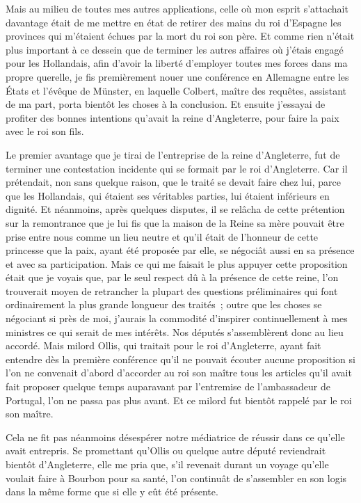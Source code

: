 \documentclass[french,twoside]{book} %
\begin{document}
Mais au milieu de toutes mes autres applications, celle où mon esprit s’attachait davantage était de me mettre en état de retirer des mains du roi d’Espagne les provinces qui m’étaient échues par la mort du roi son père. Et comme rien n’était plus important à ce dessein que de terminer les autres affaires où j’étais engagé pour les Hollandais, afin d’avoir la liberté d’employer toutes mes forces dans ma propre querelle, je fis premièrement nouer une conférence en Allemagne entre les États et l’évêque de Münster, en laquelle Colbert, maître des requêtes, assistant de ma part, porta bientôt les choses à la conclusion. Et ensuite j’essayai de profiter des bonnes intentions qu’avait la reine d’Angleterre, pour faire la paix avec le roi son fils.\par
Le premier avantage que je tirai de l’entreprise de la reine d’Angleterre, fut de terminer une contestation incidente qui se formait par le roi d’Angleterre. Car il prétendait, non sans quelque raison, que le traité se devait faire chez lui, parce que les Hollandais, qui étaient ses véritables parties, lui étaient inférieurs en dignité. Et néanmoins, après quelques disputes, il se relâcha de cette prétention sur la remontrance que je lui fis que la maison de la Reine sa mère pouvait être prise entre nous comme un lieu neutre et qu’il était de l’honneur de cette princesse que la paix, ayant été proposée par elle, se négociât aussi en sa présence et avec sa participation. Mais ce qui me faisait le plus appuyer cette proposition était que je voyais que, par le seul respect dû à la présence de cette reine, l’on trouverait moyen de retrancher la plupart des questions préliminaires qui font ordinairement la plus grande longueur des traités ; outre que les choses se négociant si près de moi, j’aurais la commodité d’inspirer continuellement à mes ministres ce qui serait de mes intérêts. Nos députés s’assemblèrent donc au lieu accordé. Mais milord Ollis, qui traitait pour le roi d’Angleterre, ayant fait entendre dès la première conférence qu’il ne pouvait écouter aucune proposition si l’on ne convenait d’abord d’accorder au roi son maître tous les articles qu’il avait fait proposer quelque temps auparavant par l’entremise de l’ambassadeur de Portugal, l’on ne passa pas plus avant. Et ce milord fut bientôt rappelé par le roi son maître.\par
Cela ne fit pas néanmoins désespérer notre médiatrice de réussir dans ce qu’elle avait entrepris. Se promettant qu’Ollis ou quelque autre député reviendrait bientôt d’Angleterre, elle me pria que, s’il revenait durant un voyage qu’elle voulait faire à Bourbon pour sa santé, l’on continuât de s’assembler en son logis dans la même forme que si elle y eût été présente.\par
\end{document}

